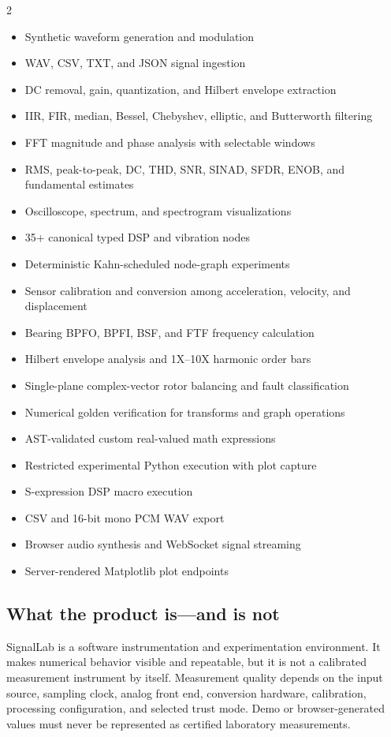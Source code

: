 \documentclass[10pt,a4paper]{article}
\begin{document}
\begin{multicols}{2}
\begin{itemize}
  \item Synthetic waveform generation and modulation
  \item WAV, CSV, TXT, and JSON signal ingestion
  \item DC removal, gain, quantization, and Hilbert envelope extraction
  \item IIR, FIR, median, Bessel, Chebyshev, elliptic, and Butterworth filtering
  \item FFT magnitude and phase analysis with selectable windows
  \item RMS, peak-to-peak, DC, THD, SNR, SINAD, SFDR, ENOB, and fundamental estimates
  \item Oscilloscope, spectrum, and spectrogram visualizations
  \item 35+ canonical typed DSP and vibration nodes
  \item Deterministic Kahn-scheduled node-graph experiments
  \item Sensor calibration and conversion among acceleration, velocity, and displacement
  \item Bearing BPFO, BPFI, BSF, and FTF frequency calculation
  \item Hilbert envelope analysis and 1X--10X harmonic order bars
  \item Single-plane complex-vector rotor balancing and fault classification
  \item Numerical golden verification for transforms and graph operations
  \item AST-validated custom real-valued math expressions
  \item Restricted experimental Python execution with plot capture
  \item S-expression DSP macro execution
  \item CSV and 16-bit mono PCM WAV export
  \item Browser audio synthesis and WebSocket signal streaming
  \item Server-rendered Matplotlib plot endpoints
\end{itemize}
\end{multicols}

\subsection{What the product is---and is not}

SignalLab is a software instrumentation and experimentation environment. It makes numerical behavior visible and repeatable, but it is not a calibrated measurement instrument by itself. Measurement quality depends on the input source, sampling clock, analog front end, conversion hardware, calibration, processing configuration, and selected trust mode. Demo or browser-generated values must never be represented as certified laboratory measurements.
\end{document}
